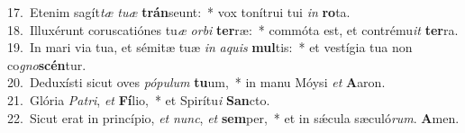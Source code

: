 {17.~}Etenim sagít\textit{tæ} \textit{tu}\textit{æ} \textbf{trán}seunt:~* vox tonítrui tui \textit{in} \textbf{ro}ta.\\
{18.~}Illuxérunt coruscatiónes tu\textit{æ} \textit{or}\textit{bi} \textbf{ter}ræ:~* commóta est, et contrému\textit{it} \textbf{ter}ra.\\
{19.~}In mari via tua, et sémitæ tuæ \textit{in} \textit{a}\textit{quis} \textbf{mul}tis:~* et vestígia tua non co\textit{gno}\textbf{scén}tur.\\
{20.~}Deduxísti sicut oves \textit{pó}\textit{pu}\textit{lum} \textbf{tu}um,~* in manu Móysi \textit{et} \textbf{A}aron.\\
{21.~}Glória \textit{Pa}\textit{tri}, \textit{et} \textbf{Fí}lio,~* et Spirítu\textit{i} \textbf{San}cto.\\
{22.~}Sicut erat in princípio, \textit{et} \textit{nunc}, \textit{et} \textbf{sem}per,~* et in sǽcula sæculó\textit{rum}. \textbf{A}men.\\
